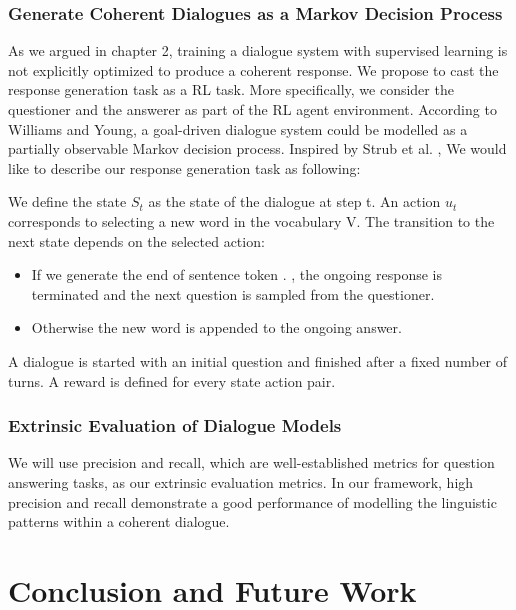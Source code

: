 \documentclass[bsc,frontabs,twoside,singlespacing,parskip,deptreport]{infthesis}     %
\begin{document}
\subsection{Generate Coherent Dialogues as a Markov Decision Process}
\noindent
As we argued in chapter 2, training a dialogue system with supervised learning is not explicitly optimized to produce a coherent response. We propose to cast the response generation task as a RL task. More specifically, we consider the questioner and the answerer as part of the RL agent environment. According to Williams and Young\cite{williams2007partially}, a goal-driven dialogue system could be modelled as a partially observable Markov decision process. Inspired by Strub et al. \cite{strub2017end}, We would like to describe our response generation task as following:

We define the state $S_t$ as the state of the dialogue at step t. An action $u_t$ corresponds to selecting a new word in the vocabulary V. The transition to the next state depends on the selected action:

\begin{itemize}
\item If we generate the end of sentence token . , the ongoing response is terminated and the next question is sampled from the questioner.
\item Otherwise the new word is appended to the ongoing answer.
\end{itemize}

A dialogue is started with an initial question and finished after a fixed number of turns. A reward is defined for every state action pair. 

\subsection{Extrinsic Evaluation of Dialogue Models}
\noindent

We will use precision and recall, which are well-established metrics for question answering tasks, as our extrinsic evaluation metrics. In our framework, high precision and recall demonstrate a good performance of modelling the linguistic patterns within a coherent dialogue.





\chapter{Conclusion and Future Work}
\end{document}
